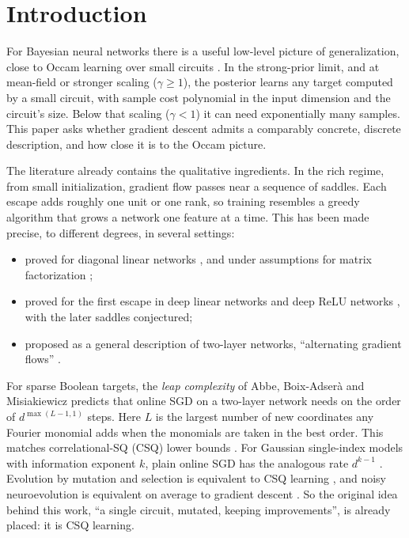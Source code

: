 \section{Introduction}\label{sec:intro}

For Bayesian neural networks there is a useful low-level picture of generalization, close to Occam learning over small circuits \cite{nngen}. In the strong-prior limit, and at mean-field or stronger scaling ($\gamma\ge1$), the posterior learns any target computed by a small circuit, with sample cost polynomial in the input dimension and the circuit's size. Below that scaling ($\gamma<1$) it can need exponentially many samples. This paper asks whether gradient descent admits a comparably concrete, discrete description, and how close it is to the Occam picture.

The literature already contains the qualitative ingredients. In the rich regime, from small initialization, gradient flow passes near a sequence of saddles. Each escape adds roughly one unit or one rank, so training resembles a greedy algorithm that grows a network one feature at a time. This has been made precise, to different degrees, in several settings:
\begin{itemize}
\item proved for diagonal linear networks \cite{pesme2023saddle}, and under assumptions for matrix factorization \cite{li2021greedy};
\item proved for the first escape in deep linear networks \cite{jacot2021saddle} and deep ReLU networks \cite{bantzis2025saddle}, with the later saddles conjectured;
\item proposed as a general description of two-layer networks, ``alternating gradient flows'' \cite{kunin2025agf}.
\end{itemize}
For sparse Boolean targets, the \emph{leap complexity} of Abbe, Boix-Adser\`a and Misiakiewicz \cite{abbe2023leap,abbe2022msp} predicts that online SGD on a two-layer network needs on the order of $d^{\max(L-1,1)}$ steps. Here $L$ is the largest number of new coordinates any Fourier monomial adds when the monomials are taken in the best order. This matches correlational-SQ (CSQ) lower bounds \cite{abbe2023leap}. For Gaussian single-index models with information exponent $k$, plain online SGD has the analogous rate $d^{k-1}$ \cite{benarous2021online}. Evolution by mutation and selection is equivalent to CSQ learning \cite{valiant2009evolvability,feldman2008evolvability}, and noisy neuroevolution is equivalent on average to gradient descent \cite{whitelam2021neuroevolution}. So the original idea behind this work, ``a single circuit, mutated, keeping improvements'', is already placed: it is CSQ learning.


